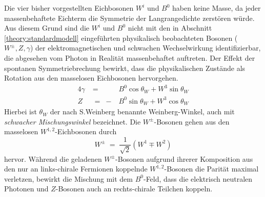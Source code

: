 Die vier bisher vorgestellten Eichbosonen $W^i$ und $B^0$ haben keine Masse, da
jeder massenbehaftete Eichterm die Symmetrie der Langrangedichte zerstören
würde. Aus diesem Grund sind die $W^i$ und $B^0$ nicht mit den in Abschnitt
\ref{theory:standardmodell} eingeführten physikalisch beobachteten Bosonen
($W^\pm, Z, \gamma$) der elektromagnetischen und schwachen Wechselwirkung
identifizierbar, die abgesehen vom Photon in Realität massenbehaftet auftreten.
Der Effekt der spontanen Symmetriebrechung bewirkt, dass die physikalischen
Zustände als Rotation aus den masselosen Eichbosonen hervorgehen.
\begin{alignat*}{4}
    \gamma &\;=\;  &B^0 \cos\theta_W + W^3\sin\theta_W \\
    Z      &\;=\; -&B^0 \sin\theta_W + W^3\cos\theta_W
\end{alignat*}
Hierbei ist $\theta_W$ der nach S.Weinberg benannte Weinberg-Winkel, auch mit
\textit{schwacher Mischungswinkel} bezeichnet. Die $W^\pm$-Bosonen gehen aus den
masselosen $W^{1,2}$-Eichbosonen durch
\begin{equation*}
    W^\pm \;=\; \frac{1}{\sqrt{2}} \left( W^1 \mp W^2 \right)
\end{equation*}
hervor. Während die geladenen $W^\pm$-Bosonen aufgrund ihrerer Komposition aus
den nur an links-chirale Fermionen koppelnde $W^{1,2}$-Bosonen die Parität
maximal verletzen, bewirkt die Mischung mit dem $B^0$-Feld, dass die elektrisch
neutralen Photonen und $Z$-Bosonen auch an rechts-chirale Teilchen koppeln.

